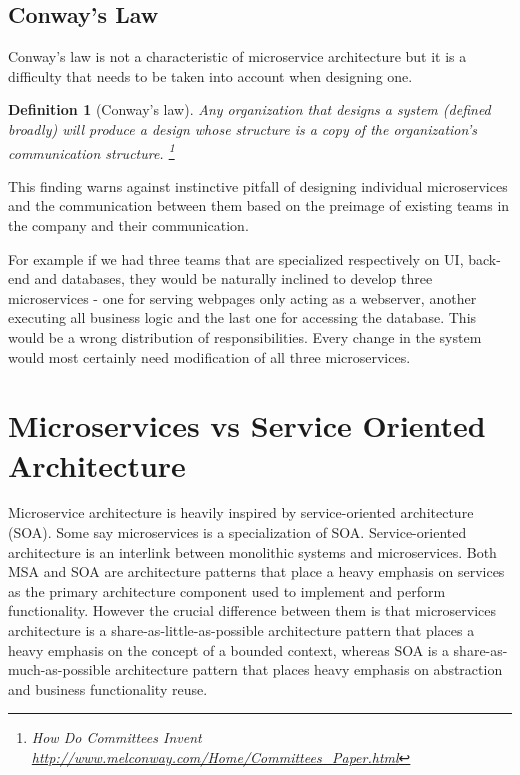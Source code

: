 \documentclass[12pt,oneside]{fithesis2}
\newtheorem{definition}{Definition}
\begin{document}
\subsection{Conway's Law}

Conway's law is not a characteristic of microservice architecture but it is a difficulty that needs to be taken into account when designing one.

\begin{definition}[Conway's law]
Any organization that designs a system (defined broadly) will produce a design whose structure is a copy of the organization’s communication structure. \footnote{How Do Committees Invent \url{http://www.melconway.com/Home/Committees_Paper.html}}
\end{definition}

This finding warns against instinctive pitfall of designing individual microservices and the communication between them based on the preimage of existing teams in the company and their communication.

For example if we had three teams that are specialized respectively on UI, back-end and databases, they would be naturally inclined to develop three microservices - one for serving webpages only acting as a webserver, another executing all business logic and the last one for accessing the database. This would be a wrong distribution of responsibilities. Every change in the system would most certainly need modification of all three microservices.

\section{Microservices vs Service Oriented Architecture}

Microservice architecture is heavily inspired by service-oriented architecture (SOA). Some say microservices is a specialization of SOA. Service-oriented architecture is an interlink between monolithic systems and microservices. Both MSA and SOA are architecture patterns that place a heavy emphasis on services as the primary architecture component used to implement and perform functionality. However the crucial difference between them is that microservices architecture is a share-as-little-as-possible architecture pattern that places a heavy emphasis on the concept of a bounded context, whereas SOA is a share-as-much-as-possible architecture pattern that places heavy emphasis on abstraction and business functionality reuse. \cite{mvsoa}
\end{document}
